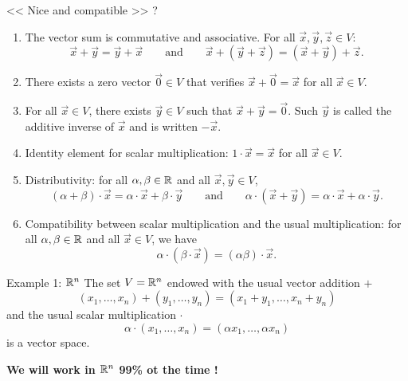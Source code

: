 \documentclass{beamer}
\begin{document}
\begin{frame}{<< Nice and compatible >> ?}
	\vspace{-0.6cm}
	{\small
		\begin{enumerate}
			\item The vector sum is commutative and associative. For all $\vec{x},\vec{y},\vec{z} \in V$:
				$$
				\vec{x}+\vec{y} = \vec{y} + \vec{x} \qquad \text{and} \qquad \vec{x} + (\vec{y} + \vec{z}) = (\vec{x}+\vec{y}) + \vec{z}.
				$$
			\item There exists a zero vector $\vec{0} \in V$ that verifies $\vec{x} + \vec{0} = \vec{x}$ for all $\vec{x} \in V$.
			\item For all $\vec{x} \in V$, there exists $\vec{y} \in V$ such that $\vec{x} + \vec{y} = \vec{0}$. Such $\vec{y}$ is called the additive inverse of $\vec{x}$ and is written $- \vec{x}$.
			\item Identity element for scalar multiplication: $1 \cdot \vec{x} = \vec{x}$ for all $\vec{x} \in V$.
			\item Distributivity: for all $\alpha,\beta \in \mathbb{R}$ and all $\vec{x},\vec{y} \in V$,
				$$
				(\alpha + \beta) \cdot \vec{x} = \alpha \cdot \vec{x} + \beta \cdot \vec{y}
				\qquad \text{and} \qquad
				\alpha \cdot (\vec{x} + \vec{y}) = \alpha \cdot \vec{x} + \alpha \cdot \vec{y}.
				$$
			\item Compatibility between scalar multiplication and the usual multiplication: for all $\alpha,\beta \in \mathbb{R}$ and all $\vec{x} \in V$, we have
				$$
				\alpha \cdot(\beta \cdot \vec{x}) = (\alpha \beta) \cdot \vec{x}.
				$$
		\end{enumerate}
	}
\end{frame}

\begin{frame}{Example 1: $\mathbb{R}^n$}
	The set $V = \mathbb{R}^n$ endowed with the usual vector addition $+$
	$$
	(x_1, \dots, x_n) + (y_1, \dots, y_n) = (x_1 + y_1, \dots, x_n + y_n)
	$$
	and the usual scalar multiplication $\cdot$
	$$
	\alpha \cdot (x_1, \dots, x_n)= (\alpha x_1, \dots, \alpha x_n)
	$$
	is a vector space.

	\vspace{0.4cm}
	\begin{center}
	\textbf{We will work in $\mathbb{R}^n$ 99\% ot the time !}
	\end{center}

\end{frame}
\end{document}
